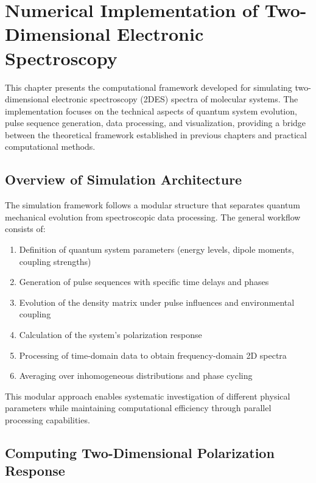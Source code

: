 \chapter{Numerical Implementation of Two-Dimensional Electronic Spectroscopy}
\label{chap:numerical_implementation}

\noindent
This chapter presents the computational framework developed for simulating two-dimensional electronic spectroscopy (2DES) spectra of molecular systems. The implementation focuses on the technical aspects of quantum system evolution, pulse sequence generation, data processing, and visualization, providing a bridge between the theoretical framework established in previous chapters and practical computational methods.

\section{Overview of Simulation Architecture}
\label{sec:simulation_architecture}

\noindent
The simulation framework follows a modular structure that separates quantum mechanical evolution from spectroscopic data processing. The general workflow consists of:

\begin{enumerate}
	\item Definition of quantum system parameters (energy levels, dipole moments, coupling strengths)
	\item Generation of pulse sequences with specific time delays and phases
	\item Evolution of the density matrix under pulse influences and environmental coupling
	\item Calculation of the system's polarization response
	\item Processing of time-domain data to obtain frequency-domain 2D spectra
	\item Averaging over inhomogeneous distributions and phase cycling
\end{enumerate}

\noindent
This modular approach enables systematic investigation of different physical parameters while maintaining computational efficiency through parallel processing capabilities.

\section{Computing Two-Dimensional Polarization Response}
\label{sec:computing_polarization}

